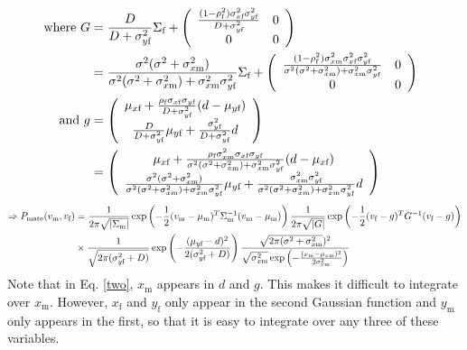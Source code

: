 \documentclass{article}
\newcommand{\x}[1]{\text{#1}}
\begin{document}
\begin{pf}
\begin{align}
\notag\\ \text{ where } G &= \frac{D}{D+\sigma_{y\x{f}}^2}\Sigma_\x{f}+\left(\begin{array}{cc} \frac{(1-\rho_\x{f}^2)\sigma_{x\x{f}}^2\sigma_{y\x{f}}^2}{D+\sigma_{y\x{f}}^2} & 0  \\ 0 & 0 \end{array}\right)  
\notag \\&= \frac{\sigma^2(\sigma^2+\sigma_{x\x{m}}^2)}{\sigma^2(\sigma^2+\sigma_{x\x{m}}^2)+\sigma_{x\x{m}}^2\sigma_{y\x{f}}^2}\Sigma_\x{f}+\left(\begin{array}{cc} \frac{(1-\rho_\x{f}^2)\sigma_{x\x{m}}^2\sigma_{x\x{f}}^2\sigma_{y\x{f}}^2}{\sigma^2(\sigma^2+\sigma_{x\x{m}}^2)+\sigma_{x\x{m}}^2\sigma_{y\x{f}}^2} & 0  \\ 0 & 0 \end{array}\right) \label{G}
\\ \text{ and } g & = \left(\begin{array}{cc}\mu_{x\x{f}}+\frac{\rho_\x{f}\sigma_{x\x{f}}\sigma_{y\x{f}}}{D+\sigma_{y\x{f}}^2}(d-\mu_{y\x{f}})
\notag\\ \frac{D}{D+\sigma_{y\x{f}}^2}\mu_{y\x{f}}+\frac{\sigma_{y\x{f}}^2}{D+\sigma_{y\x{f}}^2}d \end{array} \right) 
\notag\\&=\left(\begin{array}{cc}\mu_{x\x{f}}+\frac{\rho_\x{f}\sigma_{x\x{m}}^2\sigma_{x\x{f}}\sigma_{y\x{f}}}{\sigma^2(\sigma^2+\sigma_{x\x{m}}^2)+\sigma_{x\x{m}}^2\sigma_{y\x{f}}^2}(d-\mu_{x\x{f}})
\notag\\ \frac{\sigma^2(\sigma^2+\sigma_{x\x{m}}^2)}{\sigma^2(\sigma^2+\sigma_{x\x{m}}^2)+\sigma_{x\x{m}}^2\sigma_{y\x{f}}^2}\mu_{y\x{f}}+\frac{\sigma_{x\x{m}}^2\sigma_{y\x{f}}^2}{\sigma^2(\sigma^2+\sigma_{x\x{m}}^2)+\sigma_{x\x{m}}^2\sigma_{y\x{f}}^2}d \end{array} \right) \notag
\end{align}
\begin{align} 
\Rightarrow P_\x{mate}(v_\x{m},v_\x{f})&=\frac{1}{2\pi\sqrt{|\Sigma_\x{m}|}}\exp\left(-\frac{1}{2}(v_\x{m}-\mu_\x{m})^T\Sigma_\x{m}^{-1}(v_\x{m}-\mu_\x{m})\right)\frac{1}{2\pi\sqrt{|G|}}\exp\left(-\frac{1}{2}(v_\x{f}-g)^TG^{-1}(v_\x{f}-g)\right) \notag
\\&\times \frac{1}{\sqrt{2\pi(\sigma_{y\x{f}}^2+D)}}\exp\left(-\frac{(\mu_{y\x{f}}-d)^2}{2(\sigma_{y\x{f}}^2+D)}\right)\frac{\sqrt{2\pi(\sigma^2+\sigma_{x\x{m}}^2})^2}{\sqrt{\sigma_{x\x{m}}^2}\exp\left(-\frac{(x_\x{m}-\mu_{x\x{m}})^2}{2\sigma_{x\x{m}}^2}\right)}\label{two}
\end{align}
Note that in Eq. \ref{two}, $x_\x{m}$ appears in $d$ and $g$. This makes it difficult to integrate over $x_\x{m}$. However, $x_\x{f}$ and $y_\x{f}$ only appear in the second Gaussian function and $y_\x{m}$ only appears in the first, so that it is easy to integrate over any three of these variables.


\end{pf}
\end{document}
